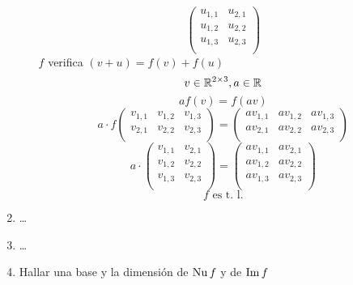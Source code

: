 \documentclass[../practica.root.tex]{subfiles}
\begin{document}
\begin{enumerate}
\begin{enumerate}
\[\begin{pmatrix}
                            u_{1,1} & u_{2,1} \\
                            u_{1,2} & u_{2,2} \\
                            u_{1,3} & u_{2,3} \\
                        \end{pmatrix}
                    \]
                    $f$ verifica $(v + u) = f(v) + f(u)$
                    \[ v \in \mathbb{R}^{2\times3}, a \in \mathbb{R} \]
                    \[ af(v) = f(av) \]
                    \[
                        a\cdot f
                        \begin{pmatrix}
                            v_{1,1} & v_{1,2} & v_{1,3} \\
                            v_{2,1} & v_{2,2} & v_{2,3} \\
                        \end{pmatrix}
                        =
                        \begin{pmatrix}
                            av_{1,1} & av_{1,2} & av_{1,3} \\
                            av_{2,1} & av_{2,2} & av_{2,3} \\
                        \end{pmatrix}
                    \] \[
                        a\cdot
                        \begin{pmatrix}
                            v_{1,1} & v_{2,1} \\
                            v_{1,2} & v_{2,2} \\
                            v_{1,3} & v_{2,3} \\
                        \end{pmatrix}
                        =
                        \begin{pmatrix}
                            av_{1,1} & av_{2,1} \\
                            av_{1,2} & av_{2,2} \\
                            av_{1,3} & av_{2,3} \\
                        \end{pmatrix}
                    \]
                    \[ \boxed{f \text{ es t. l.}} \]
          \end{enumerate}
    \item \dots
    \item \dots
    \item Hallar una base y la dimensión de \(\operatorname{Nu} f\) y de \(\operatorname{Im} f\)

\end{enumerate}
\end{document}

